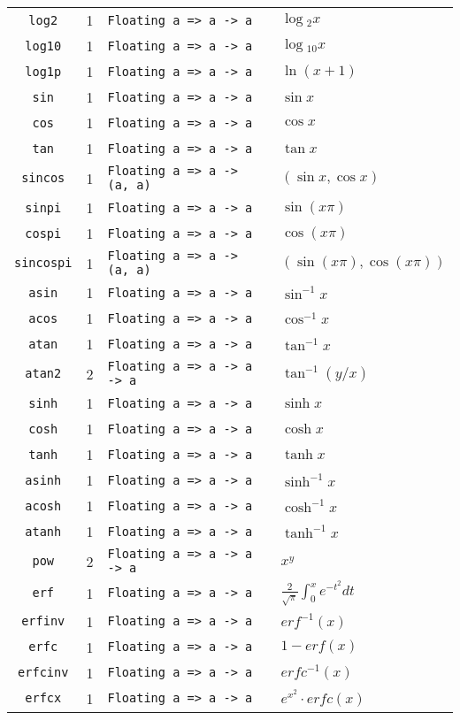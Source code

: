 \begin{longtable}[c]{ccll}
  \texttt{log2} & 1 & \texttt{Floating a => a -> a} & $\log{}_2 x$\\
  \texttt{log10} & 1 & \texttt{Floating a => a -> a} & $\log{}_{10} x$\\
  \texttt{log1p} & 1 & \texttt{Floating a => a -> a} & $\ln (x+1)$\\
  \texttt{sin} & 1 & \texttt{Floating a => a -> a} & $\sin x$\\
  \texttt{cos} & 1 & \texttt{Floating a => a -> a} & $\cos x$\\
  \texttt{tan} & 1 & \texttt{Floating a => a -> a} & $\tan x$\\
  \texttt{sincos} & 1 & \texttt{Floating a => a -> (a, a)} & $(\sin x, \cos x)$\\
  \texttt{sinpi} & 1 & \texttt{Floating a => a -> a} & $\sin (x\pi)$\\
  \texttt{cospi} & 1 & \texttt{Floating a => a -> a} & $\cos (x\pi)$\\
  \texttt{sincospi} & 1 & \texttt{Floating a => a -> (a, a)} & $(\sin (x\pi), \cos (x\pi))$\\
  \texttt{asin} & 1 & \texttt{Floating a => a -> a} & $\sin^{-1} x$\\
  \texttt{acos} & 1 & \texttt{Floating a => a -> a} & $\cos^{-1} x$\\
  \texttt{atan} & 1 & \texttt{Floating a => a -> a} & $\tan^{-1} x$\\
  \texttt{atan2} & 2 & \texttt{Floating a => a -> a -> a} & $\tan^{-1} (y/x)$\\
  \texttt{sinh} & 1 & \texttt{Floating a => a -> a} & $\sinh x$\\
  \texttt{cosh} & 1 & \texttt{Floating a => a -> a} & $\cosh x$\\
  \texttt{tanh} & 1 & \texttt{Floating a => a -> a} & $\tanh x$\\
  \texttt{asinh} & 1 & \texttt{Floating a => a -> a} & $\sinh^{-1} x$\\
  \texttt{acosh} & 1 & \texttt{Floating a => a -> a} & $\cosh^{-1} x$\\
  \texttt{atanh} & 1 & \texttt{Floating a => a -> a} & $\tanh^{-1} x$\\
  \texttt{pow} & 2 & \texttt{Floating a => a -> a -> a} & $x^y$\\
  \texttt{erf} & 1 & \texttt{Floating a => a -> a} & $\frac{2}{\sqrt{\pi}}\int_0^x e^{-t^2}dt$\\
  \texttt{erfinv} & 1 & \texttt{Floating a => a -> a} & $erf^{-1}(x)$\\
  \texttt{erfc} & 1 & \texttt{Floating a => a -> a} & $1-erf(x)$\\
  \texttt{erfcinv} & 1 & \texttt{Floating a => a -> a} & $erfc^{-1}(x)$\\
  \texttt{erfcx} & 1 & \texttt{Floating a => a -> a} & $e^{x^2}\cdot{}erfc(x)$\\


\end{longtable}
